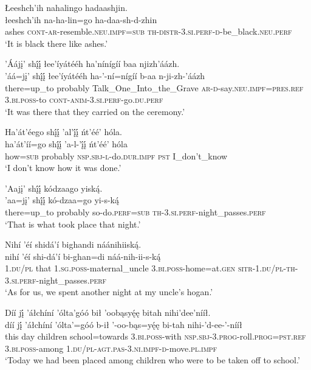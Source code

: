 \ea\label{ex:text1-26-5}
Łeeshch’ih nahalingo hadaashjin.\\
\gll łeeshch’ih	na-ha-lin=go	ha-daa-sh-d-zhin\\
     ashes	\textsc{cont}-\textsc{ar}-resemble.\textsc{neu}.\textsc{impf}=\textsc{sub}	\textsc{th}-\textsc{distr}-3.\textsc{si}.\textsc{perf}-\textsc{d}-be\_black.\textsc{neu}.\textsc{perf}\\
\glt `It is black there like ashes.'
\z

\ea\label{ex:text1-26-6}
’Áájį’ shį́į́ łee’íyátééh ha’nínígíí baa njizh’áázh.\\
\gll ’áá=jį’	shį́į́	łee’íyátééh	ha-’-ní=nígíí	b-aa	n-ji-zh-’áázh\\
     there=up\_to	probably	Talk\_One\_Into\_the\_Grave	\textsc{ar}-\textsc{d}-say.\textsc{neu}.\textsc{impf}=\textsc{pres}.\textsc{ref}	3.\textsc{bi}.\textsc{poss}-to	\textsc{cont}-\textsc{anim}-3.\textsc{si}.\textsc{perf}-go.\textsc{du}.\textsc{perf}\\
\glt `It was there that they carried on the ceremony.'
\z

\ea\label{ex:text1-26-7}
Ha’át’éego shį́į́ ’al’į́į́ ńt’éé’ hóla.\\
\gll ha’át’íí=go	shį́į́	’a-l-’į́į́	ńt’éé’	hóla\\
     how=\textsc{sub}	probably	\textsc{nsp}.\textsc{sbj}-\textsc{l}-do.\textsc{dur}.\textsc{impf}	\textsc{pst}	I\_don't\_know\\
\glt `I don't know how it was done.'
\z

\ea\label{ex:text1-26-8}
’Aajį’ shį́į́ kódzaago yiską́.\\
\gll ’aa=jį’	shį́į́	kó-dzaa=go	yi-s-ką́\\
     there=up\_to	probably	so-do.\textsc{perf}=\textsc{sub}	\textsc{th}-3.\textsc{si}.\textsc{perf}-night\_passes.\textsc{perf}\\
\glt `That is what took place that night.'
\z

\ea\label{ex:text1-27-1}
Nihí ’éí shidá’í bighandi náánihiiską́.\\
\gll nihí	’éí	shi-dá’í	bi-ghan=di	náá-nih-ii-s-ką́\\
     1.\textsc{du}/\textsc{pl}	that	1.\textsc{sg}.\textsc{poss}-maternal\_uncle	3.\textsc{bi}.\textsc{poss}-home=at.\textsc{gen}	\textsc{sitr}-1.\textsc{du}/\textsc{pl}-\textsc{th}-3.\textsc{si}.\textsc{perf}-night\_passes.\textsc{perf}\\
\glt `As for us, we spent another night at my uncle's hogan.'
\z

\newpage
\ea\label{ex:text1-27-2}
Díí jį́ ’áłchíní ’ólta’góó bił ’oobąsyę́ę bitah nihi’dee’nííł.\\
\gll díí	jį́	’áłchíní	’ólta’=góó	b-ił	’-oo-bąs=yę́ę	bi-tah	nihi-’d-ee-’-nííł\\
     this	day	children	school=towards	3.\textsc{bi}.\textsc{poss}-with	\textsc{nsp}.\textsc{sbj}-3.\textsc{prog}-roll.\textsc{prog}=\textsc{pst}.\textsc{ref}	3.\textsc{bi}.\textsc{poss}-among	1.\textsc{du}/\textsc{pl}-\textsc{agt}.\textsc{pas}-3.\textsc{ni}.\textsc{impf}-\textsc{d}-move.\textsc{pl}.\textsc{impf}\\
\glt `Today we had been placed among children who were to be taken off to school.'
\z

